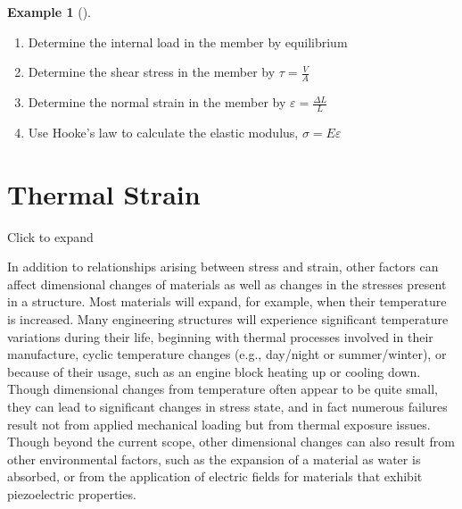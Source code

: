 \documentclass[
  letterpaper,
  DIV=11,
  numbers=noendperiod]{scrreprt}
\providecommand{\tightlist}{%
  \setlength{\itemsep}{0pt}\setlength{\parskip}{0pt}}\usepackage{longtable,booktabs,array}
\theoremstyle{definition}
\newtheorem{example}{Example}[chapter]
\theoremstyle{remark}
\begin{document}
\begin{tcolorbox}
\begin{example}[]
\begin{tcolorbox}
\end{tcolorbox}

\end{example}

\end{tcolorbox}

\begin{tcolorbox}[enhanced jigsaw, left=2mm, toptitle=1mm, breakable, coltitle=black, colbacktitle=quarto-callout-warning-color!10!white, opacitybacktitle=0.6, bottomrule=.15mm, titlerule=0mm, leftrule=.75mm, colframe=quarto-callout-warning-color-frame, bottomtitle=1mm, opacityback=0, title={Step-by-step:}, arc=.35mm, colback=white, rightrule=.15mm, toprule=.15mm]

\begin{enumerate}
\def\labelenumi{\arabic{enumi}.}
\tightlist
\item
  Determine the internal load in the member by equilibrium
\item
  Determine the shear stress in the member by \(\tau=\frac{V}{A}\)
\item
  Determine the normal strain in the member by
  \(\varepsilon=\frac{\Delta L}{L}\)
\item
  Use Hooke's law to calculate the elastic modulus,
  \(\sigma=E \varepsilon\)
\end{enumerate}

\end{tcolorbox}

\section{Thermal Strain}\label{sec-4.6}

Click to expand

In addition to relationships arising between stress and strain, other
factors can affect dimensional changes of materials as well as changes
in the stresses present in a structure. Most materials will expand, for
example, when their temperature is increased. Many engineering
structures will experience significant temperature variations during
their life, beginning with thermal processes involved in their
manufacture, cyclic temperature changes (e.g., day/night or
summer/winter), or because of their usage, such as an engine block
heating up or cooling down. Though dimensional changes from temperature
often appear to be quite small, they can lead to significant changes in
stress state, and in fact numerous failures result not from applied
mechanical loading but from thermal exposure issues. Though beyond the
current scope, other dimensional changes can also result from other
environmental factors, such as the expansion of a material as water is
absorbed, or from the application of electric fields for materials that
exhibit piezoelectric properties.
\end{document}

